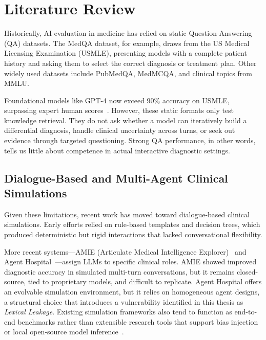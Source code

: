 \chapter{Literature Review}
\label{Chapter2}


Historically, AI evaluation in medicine has relied on static Question-Answering (QA) datasets. The MedQA dataset, for example, draws from the US Medical Licensing Examination (USMLE), presenting models with a complete patient history and asking them to select the correct diagnosis or treatment plan. Other widely used datasets include PubMedQA, MedMCQA, and clinical topics from MMLU.

Foundational models like GPT-4 now exceed 90\% accuracy on USMLE, surpassing expert human scores~\cite{schmidgall2024agentclinic}. However, these static formats only test knowledge retrieval. They do not ask whether a model can iteratively build a differential diagnosis, handle clinical uncertainty across turns, or seek out evidence through targeted questioning. Strong QA performance, in other words, tells us little about competence in actual interactive diagnostic settings.

\section{Dialogue-Based and Multi-Agent Clinical Simulations}

Given these limitations, recent work has moved toward dialogue-based clinical simulations. Early efforts relied on rule-based templates and decision trees, which produced deterministic but rigid interactions that lacked conversational flexibility.

More recent systems---AMIE (Articulate Medical Intelligence Explorer)~\cite{tu2024towards} and Agent Hospital~\cite{li2024agenthospital}---assign LLMs to specific clinical roles. AMIE showed improved diagnostic accuracy in simulated multi-turn conversations, but it remains closed-source, tied to proprietary models, and difficult to replicate. Agent Hospital offers an evolvable simulation environment, but it relies on homogeneous agent designs, a structural choice that introduces a vulnerability identified in this thesis as \textit{Lexical Leakage}. Existing simulation frameworks also tend to function as end-to-end benchmarks rather than extensible research tools that support bias injection or local open-source model inference~\cite{fan2024aihospital,liao2024automatic}.

